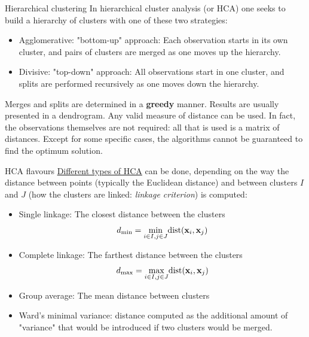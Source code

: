 \documentclass{beamer}
\begin{document}
\begin{frame}{Hierarchical clustering}
    In hierarchical cluster analysis (or HCA) one seeks to build a hierarchy of clusters with one of these two strategies:
    \begin{itemize}
        \item Agglomerative: "bottom-up" approach: Each observation starts in its own cluster, and pairs of clusters are merged as one moves up the hierarchy.
        \item Divisive: "top-down" approach: All observations start in one cluster, and splits are performed recursively as one moves down the hierarchy.
    \end{itemize}

Merges and splits are determined in a {\bf greedy} manner. Results are usually presented in a dendrogram. Any valid measure of distance can be used. In fact, the observations themselves are not required: all that is used is a matrix of distances. Except for some specific cases, the algorithms cannot be guaranteed to find the optimum solution. 
\end{frame}

\begin{frame}{HCA flavours}
    \href{https://online.stat.psu.edu/stat555/node/86/}{Different types of HCA} can be done, depending on the way the distance between points (typically the Euclidean distance) and between clusters $I$ and $J$ (how the clusters are linked: {\em linkage criterion}) is computed:
    \begin{itemize}
        \item Single linkage: The closest distance between the clusters
        \[
            d_{\mathrm{min}} = \underset{i \in I, j \in J}{\mathrm{min}}
            \mathrm{dist} 
            (\textbf{x}_i,\textbf{x}_j) 
        \]
        \item Complete linkage: The farthest distance between the clusters
        \[
            d_{\mathrm{max}} = \underset{i \in I, j \in J}{\mathrm{max}}
            \mathrm{dist} 
            (\textbf{x}_i,\textbf{x}_j) 
        \]
        \item Group average: The mean distance between clusters
        \item Ward's minimal variance: distance computed as the additional amount of "variance" that would be introduced if two clusters would be merged.
    \end{itemize}
\end{frame}
\end{document}

